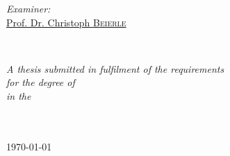 \documentclass[
11pt, %
english, %
onehalfspacing,
headsepline, %
oneside]{MastersDoctoralThesis} %
\begin{document}
\begin{titlepage}
\begin{center}
\begin{minipage}[t]{0.4\textwidth}
\begin{flushright}
\emph{Examiner:} \\
\href{https://www.fernuni-hagen.de/wbs/people.html}{Prof. Dr. Christoph \textsc{Beierle}} %
\end{flushright}
\end{minipage}\\[4.5cm]
 
\vfill

\large \textit{A thesis submitted in fulfilment of the requirements\\ for the degree of \degreename}\\[0.3cm] %
\textit{in the}\\[0.4cm]
\groupname\\\deptname\\[2cm] %
 
\vfill

{\large \today}\\[4cm] %
 
\vfill
\end{center}
\end{titlepage}

\end{document}
